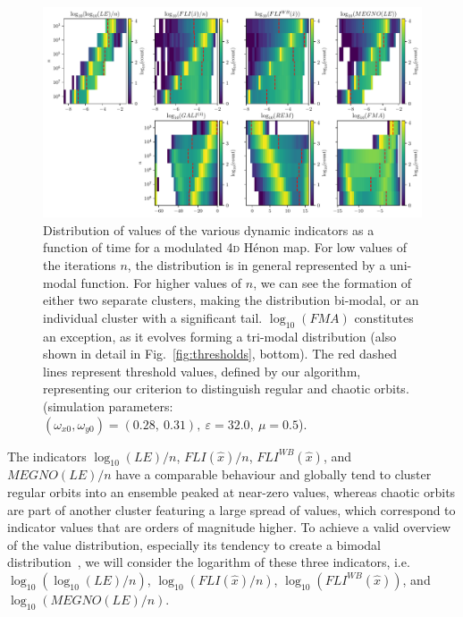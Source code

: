 \begin{chapterappendices}
\begin{figure}[th]
    \includegraphics[width=\textwidth]{6_dynamic_indicators/fig/corrected_figs/evolution_idx_3.pdf}
    \caption{Distribution of values of the various dynamic indicators as a function of time for a modulated 4\textsc{d} Hénon map. For low values of the  iterations $n$, the distribution is in general represented by a uni-modal function. For higher values of $n$, we can see the formation of either two separate clusters, making the distribution bi-modal, or an individual cluster with a significant tail. $\log_{10}(FMA)$ constitutes an exception, as it evolves forming a tri-modal distribution (also shown in detail in Fig.~\ref{fig:thresholds}, bottom).
    The red dashed lines represent threshold values, defined by our algorithm, representing our criterion to distinguish regular and chaotic orbits. (simulation parameters: $(\omega_{x0},\omega_{y0})= (0.28,\ 0.31),\ \varepsilon=32.0,\ \mu=0.5$).}
    \label{fig:generic_example_2}
\end{figure}



The indicators $\log_{10}(LE)/n$, $FLI(\hat{x})/n$, $FLI^{WB}(\hat{x})$, and $MEGNO(LE)/n$ have a comparable behaviour and globally tend to cluster regular orbits into an ensemble peaked at near-zero values, whereas chaotic orbits are part of another cluster featuring a large spread of values, which correspond to indicator values that are orders of magnitude higher. To achieve a valid overview of the value distribution, especially its tendency to create a bimodal distribution~\cite{PhysRevE.60.2761,VALLEJO200326}, we will consider the logarithm of these three indicators, i.e.~$\log_{10}(\log_{10}(LE)/n)$, $\log_{10}(FLI(\hat{x})/n)$, $\log_{10}(FLI^{WB}(\hat{x}))$, and $\log_{10}(MEGNO(LE)/n)$.


\end{chapterappendices}
